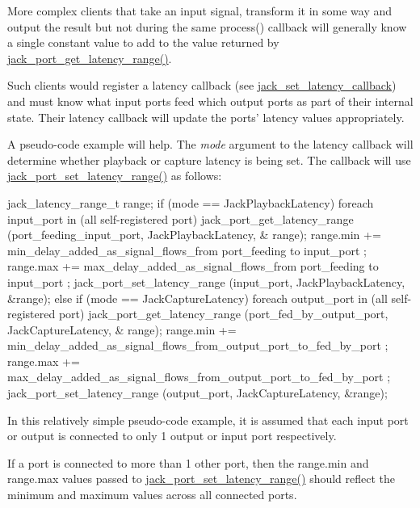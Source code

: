 \-More complex clients that take an input signal, transform it in some way and output the result but not during the same process() callback will generally know a single constant value to add to the value returned by \hyperlink{group__LatencyFunctions_gaf379bc0e88a6df6c4b7836db4b9382d7}{jack\-\_\-port\-\_\-get\-\_\-latency\-\_\-range()}.

\-Such clients would register a latency callback (see \hyperlink{jack_8h_a70a38fb1e74c5e9df9f1305c695c58bf}{jack\-\_\-set\-\_\-latency\-\_\-callback}) and must know what input ports feed which output ports as part of their internal state. \-Their latency callback will update the ports' latency values appropriately.

\-A pseudo-\/code example will help. \-The {\itshape mode\/} argument to the latency callback will determine whether playback or capture latency is being set. \-The callback will use \hyperlink{group__LatencyFunctions_ga7a8f181fcec32945db7b8e06ee1ca94b}{jack\-\_\-port\-\_\-set\-\_\-latency\-\_\-range()} as follows\-:


\begin{DoxyCode}
 jack_latency_range_t range;
 if (mode == JackPlaybackLatency) {
  foreach input_port in (all self-registered port) {
   jack_port_get_latency_range (port_feeding_input_port, JackPlaybackLatency, &
      range);
   range.min += min_delay_added_as_signal_flows_from port_feeding to input_port
      ;
   range.max += max_delay_added_as_signal_flows_from port_feeding to input_port
      ;
   jack_port_set_latency_range (input_port, JackPlaybackLatency, &range);
  }
 } else if (mode == JackCaptureLatency) {
  foreach output_port in (all self-registered port) {
   jack_port_get_latency_range (port_fed_by_output_port, JackCaptureLatency, &
      range);
   range.min += min_delay_added_as_signal_flows_from_output_port_to_fed_by_port
      ;
   range.max += max_delay_added_as_signal_flows_from_output_port_to_fed_by_port
      ;
   jack_port_set_latency_range (output_port, JackCaptureLatency, &range);
  }
 }
\end{DoxyCode}


\-In this relatively simple pseudo-\/code example, it is assumed that each input port or output is connected to only 1 output or input port respectively.

\-If a port is connected to more than 1 other port, then the range.\-min and range.\-max values passed to \hyperlink{group__LatencyFunctions_ga7a8f181fcec32945db7b8e06ee1ca94b}{jack\-\_\-port\-\_\-set\-\_\-latency\-\_\-range()} should reflect the minimum and maximum values across all connected ports.

